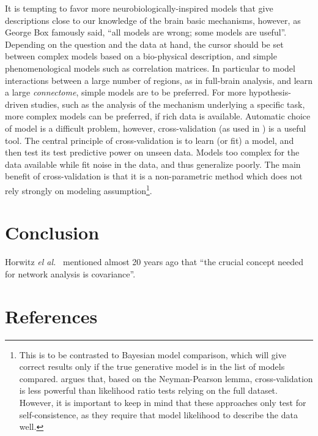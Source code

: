 \documentclass[5p]{elsarticle}
\begin{document}
It is tempting to favor more neurobiologically-inspired models that give
descriptions close to our knowledge of the brain basic mechanisms,
however, as George Box famously said, ``all models are wrong; some models
are useful''. Depending on the question and the data at hand, the cursor
should be set between complex models based on a bio-physical description,
and simple phenomenological models such as correlation matrices. In
particular to model interactions between a large number of regions, as in
full-brain analysis, and learn a large \emph{connectome}, simple models
are to be preferred. For more hypothesis-driven studies, such as the
analysis of the mechanism underlying a specific task, more complex models
can be preferred, if rich data is available. Automatic choice of model is
a difficult problem, however, cross-validation (as used in
\cite{varoquaux2010c,craddock2011,strother2006}) is a useful tool. The
central principle of cross-validation is to learn (or fit) a model, and
then test its test predictive power on unseen data. Models too complex
for the data available while fit noise in the data, and thus generalize
poorly. The main benefit of cross-validation is that it is a
non-parametric method which does not rely strongly on modeling
assumption\footnote{This is to be contrasted to Bayesian model
comparison, which will give correct results only if the true generative
model is in the list of models compared. \cite{friston2012} argues that,
based on the Neyman-Pearson lemma, cross-validation is less powerful than
likelihood ratio tests relying on the full dataset. However, it is
important to keep in mind that these approaches only test for
self-consistence, as they require that model likelihood to describe the
data well.}.



\section{Conclusion}

Horwitz \emph{el al.}\ \cite{horwitz1995} mentioned almost 20 years ago
that ``the crucial concept needed for network analysis is covariance''.


{
\section*{References} \small 
 }

\end{document}
